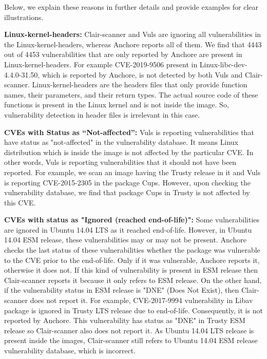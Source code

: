 \documentclass[a4paper,num-refs]{oup-contemporary}
\begin{document}
Below, we explain these reasons in further details and provide examples
for clear illustrations.
%

\textbf{Linux-kernel-headers:} Clair-scanner and Vuls are ignoring all vulnerabilities in the Linux-kernel-headers,
whereas Anchore reports all of them.
We find that 4443 out of 4453 vulnerabilities that are only reported by Anchore are present in Linux-kernel-headers.
For example CVE-2019-9506 present in Linux-libc-dev-4.4.0-31.50, which is reported by Anchore, is not
detected by both Vuls and Clair-scanner.
Linux-kernel-headers are the headers files that only provide function names, their parameters, and their
return types.
The actual source code of these functions is present in the Linux kernel and is not inside the image.
So, vulnerability detection in header files
is irrelevant in this case.

\textbf{CVEs with Status as “Not-affected”:} Vuls is reporting vulnerabilities that have status
as "not-affected" in the vulnerability database. It means Linux distribution which is inside the image is not affected
by the particular CVE. In other words, Vuls is reporting vulnerabilities that it should not have been reported.
For example, we scan an image having the Trusty release in it and Vuls is reporting CVE-2015-2305
in the package Cups. However, upon checking the vulnerability database, we find that package Cups in Trusty is not
affected by this CVE.

\textbf{CVEs with status as "Ignored (reached end-of-life)":}
Some vulnerabilities are ignored in Ubuntu 14.04 LTS as it reached end-of-life. 
However, in Ubuntu 14.04 ESM release, these vulnerabilities may or may not be present.
Anchore checks the last status of these vulnerabilities whether the package was vulnerable to the CVE
prior to the end-of-life. Only if it was vulnerable, Anchore reports it, otherwise it does not.
If this kind of vulnerability is present in ESM release then Clair-scanner reports it because it
only refers to ESM release. On the other hand, if the vulnerability
status in ESM release is "DNE" (Does Not Exist), then Clair-scanner does not report it. 
For example, CVE-2017-9994 vulnerability in Libav package is ignored in Trusty LTS release due to end-of-life.
Consequently, it is not reported by Anchore. This vulnerability has status as "DNE" in Trusty ESM
release so Clair-scanner also does not report it. As Ubuntu 14.04 LTS release is present inside the images,
Clair-scanner still refers to Ubuntu 14.04 ESM release vulnerability database, which is incorrect.
\end{document}
